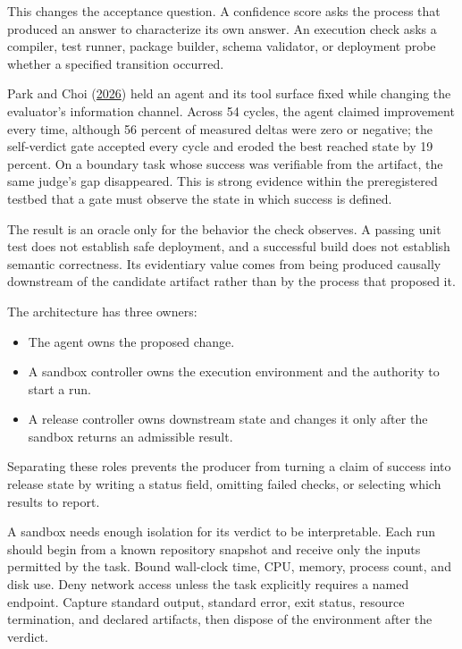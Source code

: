 This changes the acceptance question. A confidence score asks the process that produced an answer to characterize its own answer. An execution check asks a compiler, test runner, package builder, schema validator, or deployment probe whether a specified transition occurred.

Park and Choi (\href{https://arxiv.org/abs/2607.25152}{2026}) held an agent and its tool surface fixed while changing the evaluator's information channel. Across 54 cycles, the agent claimed improvement every time, although 56 percent of measured deltas were zero or negative; the self-verdict gate accepted every cycle and eroded the best reached state by 19 percent. On a boundary task whose success was verifiable from the artifact, the same judge's gap disappeared. This is strong evidence within the preregistered testbed that a gate must observe the state in which success is defined.

The result is an oracle only for the behavior the check observes. A passing unit test does not establish safe deployment, and a successful build does not establish semantic correctness. Its evidentiary value comes from being produced causally downstream of the candidate artifact rather than by the process that proposed it.


The architecture has three owners:

\begin{itemize}
\tightlist
\item
  The agent owns the proposed change.
\item
  A sandbox controller owns the execution environment and the authority to start a run.
\item
  A release controller owns downstream state and changes it only after the sandbox returns an admissible result.
\end{itemize}

Separating these roles prevents the producer from turning a claim of success into release state by writing a status field, omitting failed checks, or selecting which results to report.

A sandbox needs enough isolation for its verdict to be interpretable. Each run should begin from a known repository snapshot and receive only the inputs permitted by the task. Bound wall-clock time, CPU, memory, process count, and disk use. Deny network access unless the task explicitly requires a named endpoint. Capture standard output, standard error, exit status, resource termination, and declared artifacts, then dispose of the environment after the verdict.

